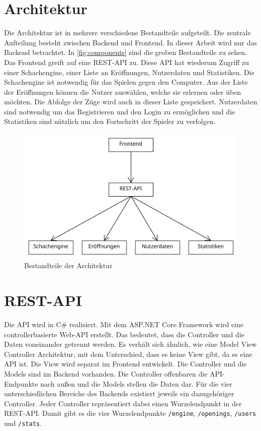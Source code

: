 \section{Architektur}
Die Architektur ist in mehrere verschiedene Bestandteile aufgeteilt. Die zentrale Aufteilung besteht zwischen Backend und Frontend. In dieser Arbeit wird nur das Backend betrachtet. In \autoref{fig:components} sind die groben Bestandteile zu sehen. Das Frontend greift auf eine \ac{REST}-API zu. Diese API hat wiederum Zugriff zu einer Schachengine, einer Liste an Eröffnungen, Nutzerdaten und Statistiken. Die Schachengine ist notwendig für das Spielen gegen den Computer. Aus der Liste der Eröffnungen können die Nutzer auswählen, welche sie erlernen oder üben möchten. Die Abfolge der Züge wird auch in dieser Liste gespeichert. Nutzerdaten sind notwendig um das Registrieren und den Login zu ermöglichen und die Statistiken sind nützlich um den Fortschritt der Spieler zu verfolgen.

\begin{figure}[h]
    \includegraphics{images/diagrams/components.pdf}
    \caption{Bestandteile der Architektur}
    \label{fig:components}
\end{figure}

\section{REST-API}
Die API wird in C\# realisiert. Mit dem ASP.NET Core Framework wird eine controllerbasierte Web-API erstellt. Das bedeutet, dass die Controller und die Daten voneinander getrennt werden. Es verhält sich ähnlich, wie eine Model View Controller Architektur, mit dem Unterschied, dass es keine View gibt, da es eine API ist. Die View wird separat im Frontend entwickelt. Die Controller und die Models sind im Backend vorhanden. Die Controller offenbaren die API-Endpunkte nach außen und die Models stellen die Daten dar. Für die vier unterschiedlichen Bereiche des Backends existiert jeweils ein dazugehöriger Controller. Jeder Controller repräsentiert dabei einen Wurzelendpunkt in der REST-API. Damit gibt es die vier Wurzelendpunkte \lstinline{/engine}, \lstinline{/openings}, \lstinline{/users} und \lstinline{/stats}. 

